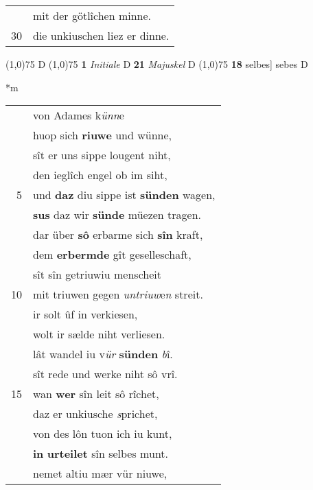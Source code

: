 \documentclass[8pt,a4paper,notitlepage]{article}
\begin{document}
\begin{table}[ht]
\begin{minipage}[t]{0.5\linewidth}
\begin{tabular}{rl}
 & mit der götlîchen minne.\\ 
30 & die unkiuschen liez er dinne.\\ 
\end{tabular}
\scriptsize
\line(1,0){75} \newline
D \newline
\line(1,0){75} \newline
\textbf{1} \textit{Initiale} D  \textbf{21} \textit{Majuskel} D  \newline
\line(1,0){75} \newline
\textbf{18} selbes] sebes D \newline
\end{minipage}
\hspace{0.5cm}
\begin{minipage}[t]{0.5\linewidth}
\small
\begin{center}*m
\end{center}
\begin{tabular}{rl}
 & von Adames k\textit{ünn}e\\ 
 & huop sich \textbf{riuwe} und wünne,\\ 
 & sît er uns sippe lougent niht,\\ 
 & den ieglîch engel ob im siht,\\ 
5 & und \textbf{daz} diu sippe ist \textbf{sünden} wagen,\\ 
 & \textbf{sus} daz wir \textbf{sünde} müezen tragen.\\ 
 & dar über \textbf{sô} erbarme sich \textbf{sîn} kraft,\\ 
 & dem \textbf{erbermde} gît geselleschaft,\\ 
 & sît sîn getriuwiu menscheit\\ 
10 & mit triuwen gegen \textit{untriuw}e\textit{n} streit.\\ 
 & ir solt ûf in verkiesen,\\ 
 & wolt ir sælde niht verliesen.\\ 
 & lât wandel iu v\textit{ür} \textbf{sünden} \textit{b}î.\\ 
 & sît rede und werke niht sô vrî.\\ 
15 & wan \textbf{wer} sîn leit sô rîchet,\\ 
 & daz er unkiusche \textit{s}prichet,\\ 
 & von des lôn tuon ich iu kunt,\\ 
 & \textbf{in} \textbf{urteilet} sîn selbes munt.\\ 
 & nemet altiu mær vür niuwe,\\ 

\end{tabular}
\end{minipage}
\end{table}
\end{document}
